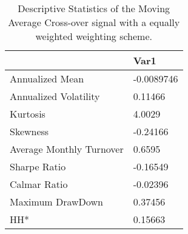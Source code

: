 \begin{table}[H]
\centering
\begin{tabular}{ll}
\hline& Var1 \\ 
\hline 
Annualized Mean & -0.0089746 \\ 
Annualized Volatility & 0.11466 \\ 
Kurtosis & 4.0029 \\ 
Skewness & -0.24166 \\ 
Average Monthly Turnover & 0.6595 \\ 
Sharpe Ratio & -0.16549 \\ 
Calmar Ratio & -0.02396 \\ 
Maximum DrawDown & 0.37456 \\ 
HH* & 0.15663 \\ 
\hline
\end{tabular}
\caption{Descriptive Statistics of the Moving Average Cross-over signal with a equally weighted weighting scheme.}
\label{MAEW}
\end{table}